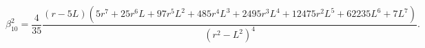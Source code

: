 \begin{equation}
\beta_{10}^{2}=\frac{4}{35}\frac{(r-5L)(5r^7+25r^6 L+97 r^5 L^2 +485
r^4 L^3 +2495 r^3 L^4 + 12475 r^2 L^5 +62235 L^6 +7
L^7)}{(r^2-L^2)^4}.
\end{equation}

